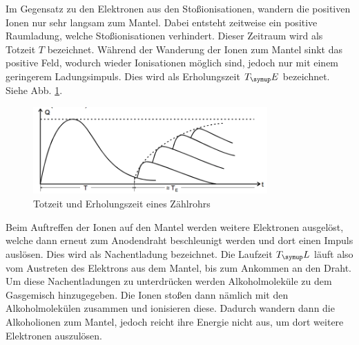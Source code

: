 Im Gegensatz zu den Elektronen aus den Stoßionisationen, wandern die positiven Ionen
nur sehr langsam zum Mantel. Dabei entsteht zeitweise ein positive Raumladung, welche
Stoßionisationen verhindert. Dieser Zeitraum wird als Totzeit $T$ bezeichnet. Während
der Wanderung der Ionen zum Mantel sinkt das positive Feld, wodurch wieder Ionisationen
möglich sind, jedoch nur mit einem geringerem Ladungsimpuls. Dies wird als Erholungszeit
$T_\su{E}$ bezeichnet. Siehe Abb. \ref{fig:totzeit}.
\begin{figure}
  \centering
  \includegraphics[width=0.8\textwidth]{bilder/totzeit.png}
  \caption{Totzeit und Erholungszeit eines Zählrohrs \cite{703}}
  \label{fig:totzeit}
\end{figure}
Beim Auftreffen der Ionen auf den Mantel werden weitere Elektronen ausgelöst, welche
dann erneut zum Anodendraht beschleunigt werden und dort einen Impuls auslösen. Dies
wird als Nachentladung bezeichnet. Die Laufzeit $T_\su{L}$ läuft also vom Austreten
des Elektrons aus dem Mantel, bis zum Ankommen an den Draht. Um diese Nachentladungen zu
unterdrücken werden Alkoholmoleküle zu dem Gasgemisch hinzugegeben. Die Ionen stoßen
dann nämlich mit den Alkoholmolekülen zusammen und ionisieren diese. Dadurch
wandern dann die Alkoholionen zum Mantel, jedoch reicht ihre Energie nicht aus, um dort
weitere Elektronen auszulösen.

